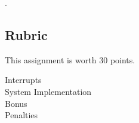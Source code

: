


\filesubmission.

\policyforcodethatdoesnotcompile

\latepolicy

\subsection*{Rubric}

This assignment is worth 30 points.
\begin{description}
    \item[Interrupts] %
    \interruptsRubric

    \item[System Implementation] %
    \simpleSystemRubric

    \item[Bonus]

    \item[Penalties]
    \softwareengineeringpenalties
    \interruptPenalties
\end{description}
